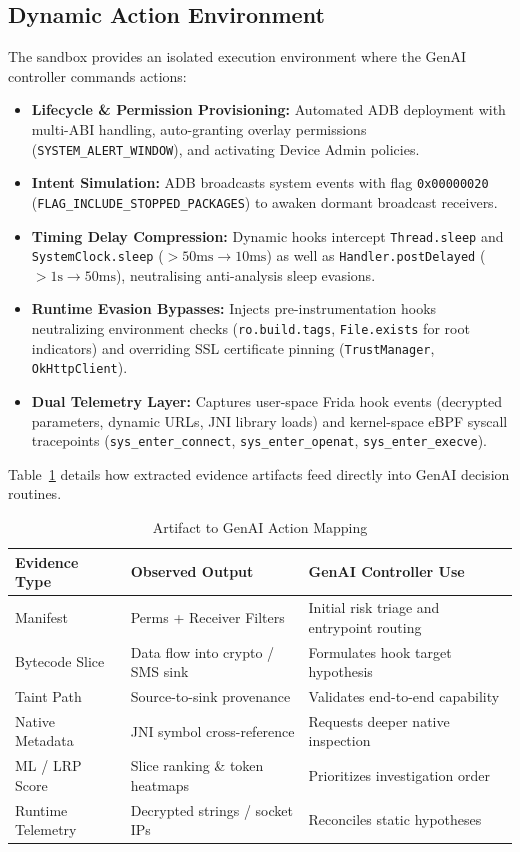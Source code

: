 \documentclass[conference]{IEEEtran}
\begin{document}
\subsection{Dynamic Action Environment}
The sandbox provides an isolated execution environment where the GenAI controller commands actions:
\begin{itemize}
    \item \textbf{Lifecycle \& Permission Provisioning:} Automated ADB deployment with multi-ABI handling, auto-granting overlay permissions (\texttt{SYSTEM\_ALERT\_WINDOW}), and activating Device Admin policies.
    \item \textbf{Intent Simulation:} ADB broadcasts system events with flag \texttt{0x00000020} (\texttt{FLAG\_INCLUDE\_STOPPED\_PACKAGES}) to awaken dormant broadcast receivers.
    \item \textbf{Timing Delay Compression:} Dynamic hooks intercept \texttt{Thread.sleep} and \texttt{SystemClock.sleep} ($>50\text{ms} \to 10\text{ms}$) as well as \texttt{Handler.postDelayed} ($>1\text{s} \to 50\text{ms}$), neutralising anti-analysis sleep evasions.
    \item \textbf{Runtime Evasion Bypasses:} Injects pre-instrumentation hooks neutralizing environment checks (\texttt{ro.build.tags}, \texttt{File.exists} for root indicators) and overriding SSL certificate pinning (\texttt{TrustManager}, \texttt{OkHttpClient}).
    \item \textbf{Dual Telemetry Layer:} Captures user-space Frida hook events (decrypted parameters, dynamic URLs, JNI library loads) and kernel-space eBPF syscall tracepoints (\texttt{sys\_enter\_connect}, \texttt{sys\_enter\_openat}, \texttt{sys\_enter\_execve}).
\end{itemize}

Table~\ref{tab:evidence_mapping} details how extracted evidence artifacts feed directly into GenAI decision routines.

\begin{table}[t]
\centering
\caption{Artifact to GenAI Action Mapping}
\label{tab:evidence_mapping}
\begin{tabularx}{\linewidth}{lXX}
\toprule
\textbf{Evidence Type} & \textbf{Observed Output} & \textbf{GenAI Controller Use} \\
\midrule
Manifest & Perms + Receiver Filters & Initial risk triage and entrypoint routing \\
Bytecode Slice & Data flow into crypto / SMS sink & Formulates hook target hypothesis \\
Taint Path & Source-to-sink provenance & Validates end-to-end capability \\
Native Metadata & JNI symbol cross-reference & Requests deeper native inspection \\
ML / LRP Score & Slice ranking \& token heatmaps & Prioritizes investigation order \\
Runtime Telemetry & Decrypted strings / socket IPs & Reconciles static hypotheses \\
\bottomrule
\end{tabularx}
\end{table}
\end{document}
